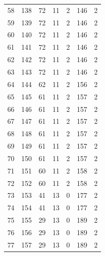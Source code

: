 \documentclass[a4paper,twoside,12pt]{book}
\begin{document}
\begin{appendices}
\begin{table}
\begin{tabular}{lrrrrrr}
		58  &    138 &        72 &        11 &               2 &             146 &         2 \\
		59  &    139 &        72 &        11 &               2 &             146 &         2 \\
		60  &    140 &        72 &        11 &               2 &             146 &         2 \\
		61  &    141 &        72 &        11 &               2 &             146 &         2 \\
		62  &    142 &        72 &        11 &               2 &             146 &         2 \\
		63  &    143 &        72 &        11 &               2 &             146 &         2 \\
		64  &    144 &        62 &        11 &               2 &             156 &         2 \\
		65  &    145 &        61 &        11 &               2 &             157 &         2 \\
		66  &    146 &        61 &        11 &               2 &             157 &         2 \\
		67  &    147 &        61 &        11 &               2 &             157 &         2 \\
		68  &    148 &        61 &        11 &               2 &             157 &         2 \\
		69  &    149 &        61 &        11 &               2 &             157 &         2 \\
		70  &    150 &        61 &        11 &               2 &             157 &         2 \\
		71  &    151 &        60 &        11 &               2 &             158 &         2 \\
		72  &    152 &        60 &        11 &               2 &             158 &         2 \\
		73  &    153 &        41 &        13 &               0 &             177 &         2 \\
		74  &    154 &        41 &        13 &               0 &             177 &         2 \\
		75  &    155 &        29 &        13 &               0 &             189 &         2 \\
		76  &    156 &        29 &        13 &               0 &             189 &         2 \\
		77  &    157 &        29 &        13 &               0 &             189 &         2 \\

\end{tabular}
\end{table}
\end{appendices}
\end{document}
